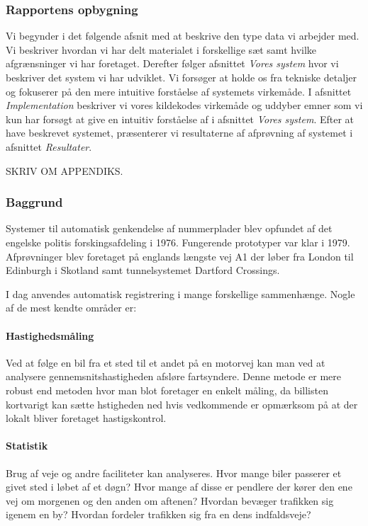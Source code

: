 \subsubsection*{Rapportens opbygning}
Vi begynder i det følgende afsnit med at beskrive den type data vi arbejder med. Vi beskriver hvordan vi har delt materialet i forskellige sæt samt hvilke afgrænsninger vi har foretaget. Derefter følger afsnittet \textit{Vores system} hvor vi beskriver det system vi har udviklet. Vi forsøger at holde os fra tekniske detaljer og fokuserer på den mere intuitive forståelse af systemets virkemåde. I afsnittet \textit{Implementation} beskriver vi vores kildekodes virkemåde og uddyber emner som vi kun har forsøgt at give en intuitiv forståelse af i afsnittet \textit{Vores system}. Efter at have beskrevet systemet, præsenterer vi resultaterne af afprøvning af systemet i afsnittet \textit{Resultater}.

SKRIV OM APPENDIKS.

\subsubsection*{Baggrund}
Systemer til automatisk genkendelse af nummerplader blev opfundet af det engelske politis forskingsafdeling i 1976. Fungerende prototyper var klar i 1979. Afprøvninger blev foretaget på englands længste vej A1 der løber fra London til Edinburgh i Skotland samt tunnelsystemet Dartford Crossings\cite{wiki_baggrund}. 

I dag anvendes automatisk registrering i mange forskellige sammenhænge. Nogle af de mest kendte områder er: 
\paragraph{Hastighedsmåling}
Ved at følge en bil fra et sted til et andet på en motorvej kan man ved at analysere gennemsnitshastigheden afsløre fartsyndere. Denne metode er mere robust end metoden hvor man blot foretager en enkelt måling, da billisten kortvarigt kan sætte hstigheden ned hvis vedkommende er opmærksom på at der lokalt bliver foretaget hastigskontrol.

\paragraph{Statistik}
Brug af veje og andre faciliteter kan analyseres. Hvor mange biler passerer et givet sted i løbet af et døgn? Hvor mange af disse er pendlere der kører den ene vej om morgenen og den anden om aftenen? Hvordan bevæger trafikken sig igenem en by? Hvordan fordeler trafikken sig fra en dens indfaldsveje?

